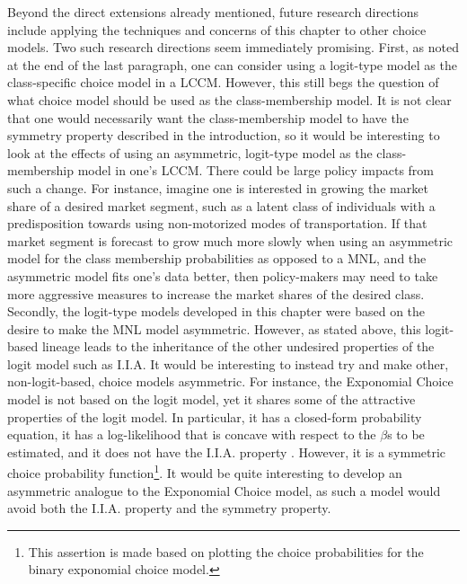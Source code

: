 Beyond the direct extensions already mentioned, future research directions include applying the techniques and concerns of this chapter to other choice models. Two such research directions seem immediately promising. First, as noted at the end of the last paragraph, one can consider using a logit-type model as the class-specific choice model in a LCCM. However, this still begs the question of what choice model should be used as the class-membership model. It is not clear that one would necessarily want the class-membership model to have the symmetry property described in the introduction, so it would be interesting to look at the effects of using an asymmetric, logit-type model as the class-membership model in one's LCCM. There could be large policy impacts from such a change. For instance, imagine one is interested in growing the market share of a desired market segment, such as a latent class of individuals with a predisposition towards using non-motorized modes of transportation. If that market segment is forecast to grow much more slowly when using an asymmetric model for the class membership probabilities as opposed to a MNL, and the asymmetric model fits one's data better, then policy-makers may need to take more aggressive measures to increase the market shares of the desired class. Secondly, the logit-type models developed in this chapter were based on the desire to make the MNL model asymmetric. However, as stated above, this logit-based lineage leads to the inheritance of the other undesired properties of the logit model such as I.I.A. It would be interesting to instead try and make other, non-logit-based, choice models asymmetric. For instance, the Exponomial Choice model is not based on the logit model, yet it shares some of the attractive properties of the logit model. In particular, it has a closed-form probability equation, it has a log-likelihood that is concave with respect to the $\beta$s to be estimated, and it does not have the I.I.A. property \citep{alptekinoglu_exponomial_2016}. However, it is a symmetric choice probability function\footnote{This assertion is made based on plotting the choice probabilities for the binary exponomial choice model.}. It would be quite interesting to develop an asymmetric analogue to the Exponomial Choice model, as such a model would avoid both the I.I.A. property and the symmetry property.

